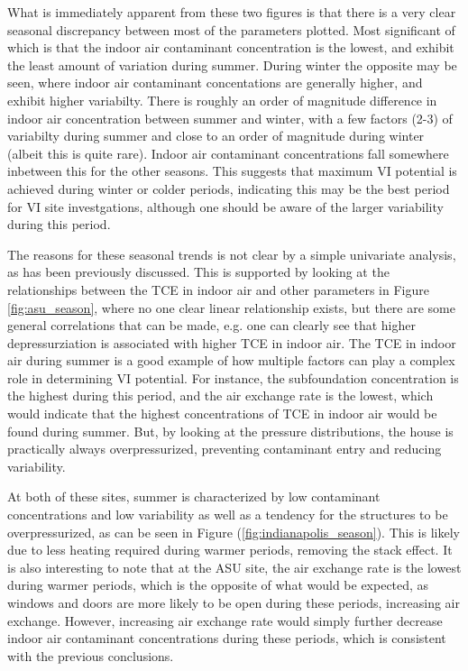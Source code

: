 \documentclass[journal=esthag,manuscript=article]{achemso}
\begin{document}
What is immediately apparent from these two figures is that there is a very clear seasonal discrepancy between most of the parameters plotted.
Most significant of which is that the indoor air contaminant concentration is the lowest, and exhibit the least amount of variation during summer.
During winter the opposite may be seen, where indoor air contaminant concentations are generally higher, and exhibit higher variabilty.
There is roughly an order of magnitude difference in indoor air concentration between summer and winter, with a few factors (2-3) of variabilty during summer and close to an order of magnitude during winter (albeit this is quite rare).
Indoor air contaminant concentrations fall somewhere inbetween this for the other seasons.
This suggests that maximum VI potential is achieved during winter or colder periods, indicating this may be the best period for VI site investgations, although one should be aware of the larger variability during this period. \par

The reasons for these seasonal trends is not clear by a simple univariate analysis, as has been previously discussed.
This is supported by looking at the relationships between the TCE in indoor air and other parameters in Figure \ref{fig:asu_season}, where no one clear linear relationship exists, but there are some general correlations that can be made, e.g. one can clearly see that higher depressurziation is associated with higher TCE in indoor air.
The TCE in indoor air during summer is a good example of how multiple factors can play a complex role in determining VI potential.
For instance, the subfoundation concentration is the highest during this period, and the air exchange rate is the lowest, which would indicate that the highest concentrations of TCE in indoor air would be found during summer.
But, by looking at the pressure distributions, the house is practically always overpressurized, preventing contaminant entry and reducing variability. \par

At both of these sites, summer is characterized by low contaminant concentrations and low variability as well as a tendency for the structures to be overpressurized, as can be seen in Figure (\ref{fig:indianapolis_season}).
This is likely due to less heating required during warmer periods, removing the stack effect.
It is also interesting to note that at the ASU site, the air exchange rate is the lowest during warmer periods, which is the opposite of what would be expected, as windows and doors are more likely to be open during these periods, increasing air exchange.
However, increasing air exchange rate would simply further decrease indoor air contaminant concentrations during these periods, which is consistent with the previous conclusions.
\end{document}
